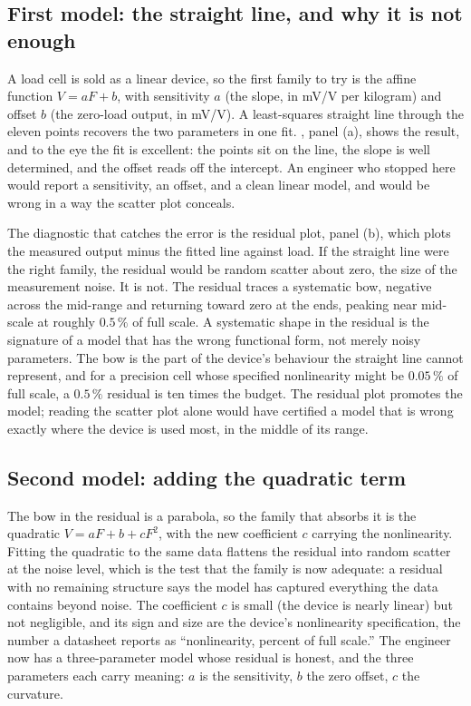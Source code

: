 

\subsection{First model: the straight line, and why it is not enough}

A load cell is sold as a linear device, so the first family to try is
the affine function $V = a F + b$, with sensitivity $a$ (the slope,
in \si{\milli\volt}/\si{\volt} per kilogram) and offset $b$ (the
zero-load output, in \si{\milli\volt}/\si{\volt}). A least-squares
straight line through the eleven points recovers the two parameters
in one fit. , panel
(a), shows the result, and to the eye the fit is excellent: the
points sit on the line, the slope is well determined, and the offset
reads off the intercept. An engineer who stopped here would report a
sensitivity, an offset, and a clean linear model, and would be wrong
in a way the scatter plot conceals.

The diagnostic that catches the error is the residual plot, panel
(b), which plots the measured output minus the fitted line against
load. If the straight line were the right family, the residual would
be random scatter about zero, the size of the measurement noise. It
is not. The residual traces a systematic bow, negative across the
mid-range and returning toward zero at the ends, peaking near
mid-scale at roughly $0.5\,\%$ of full scale. A systematic shape in
the residual is the signature of a model that has the wrong
functional form, not merely noisy parameters. The bow is the part of
the device's behaviour the straight line cannot represent, and for a
precision cell whose specified nonlinearity might be $0.05\,\%$ of
full scale, a $0.5\,\%$ residual is ten times the budget. The
residual plot promotes the model; reading the scatter plot alone
would have certified a model that is wrong exactly where the device
is used most, in the middle of its range.

\subsection{Second model: adding the quadratic term}

The bow in the residual is a parabola, so the family that absorbs it
is the quadratic $V = a F + b + c F^{2}$, with the new coefficient
$c$ carrying the nonlinearity. Fitting the quadratic to the same data
flattens the residual into random scatter at the noise level, which
is the test that the family is now adequate: a residual with no
remaining structure says the model has captured everything the data
contains beyond noise. The coefficient $c$ is small (the device is
nearly linear) but not negligible, and its sign and size are the
device's nonlinearity specification, the number a datasheet reports
as ``nonlinearity, percent of full scale.'' The engineer now has a
three-parameter model whose residual is honest, and the three
parameters each carry meaning: $a$ is the sensitivity, $b$ the zero
offset, $c$ the curvature.

